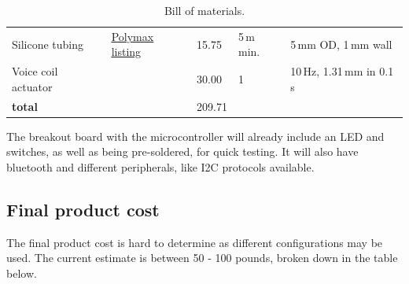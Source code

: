 \documentclass[10pt, a4paper]{article}
\begin{document}
\begin{table}[H]
\begin{tabularx}{\linewidth}{>{\raggedright\arraybackslash}X l l l l}
        Silicone tubing
                       & \href{https://www.polymax.co.uk/silicone/silicone-tubing}{\uline{Polymax listing}}
                       & 15.75                                                                                                                                                                 & 5\,m min.         & 5\,mm OD, 1\,mm wall                  \\
        Voice coil actuator
                       &
                       & 30.00
                       & 1
                       & 10\,Hz, 1.31\,mm in 0.1\,s                                                                                                                                                                                                        \\
        \midrule
        \textbf{total} &                                                                                                                                                                       & 209.71            &                                       \\
        \bottomrule
    \end{tabularx}
    \caption{Bill of materials.}
\end{table}

The breakout board with the microcontroller will already include an LED and switches, as well as being pre-soldered, for quick testing. It will also have bluetooth and different peripherals, like I2C protocols available.

\subsection{Final product cost}
The final product cost is hard to determine as different configurations may be used. The current estimate is between 50 - 100 pounds, broken down in the table below.
\end{document}
